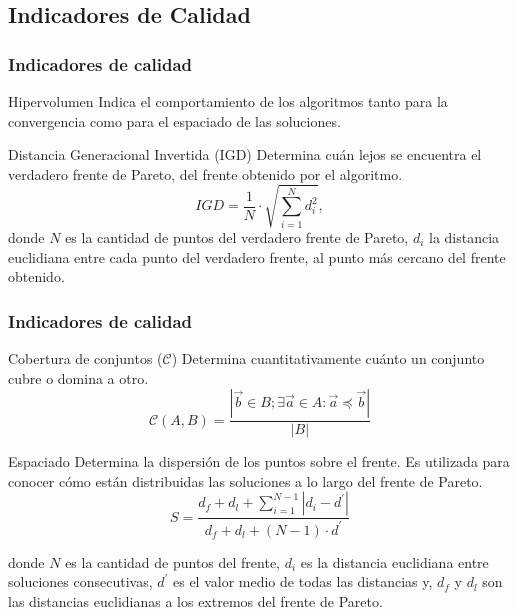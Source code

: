 \documentclass[10pt,compress]{beamer}
\begin{document}
\subsection{Indicadores de Calidad}
\begin{frame}
	\frametitle{Indicadores de calidad}
	\begin{block}{Hipervolumen}
			Indica el comportamiento de los algoritmos tanto para la convergencia como para el espaciado de las soluciones.
	\end{block}
	\begin{block}{Distancia Generacional Invertida (IGD)}
		Determina cu\'an lejos se encuentra el verdadero frente de Pareto, del frente obtenido por el algoritmo.
		$$
	IGD = \frac{1}{N} \cdot \sqrt{\sum^{N}_{i=1}{d^2_i}},
      $$     
      donde $N$ es la cantidad de puntos del verdadero frente de Pareto, 
			$d_i$ la distancia euclidiana entre cada punto del verdadero frente, al punto m\'as cercano del frente obtenido.       
	\end{block}
\end{frame}
\begin{frame}
	\frametitle{Indicadores de calidad}
	\begin{block}{Cobertura de conjuntos ($\mathcal{C}$)}
		Determina cuantitativamente cu\'anto un conjunto cubre o domina a otro.
		$$
	      \mathcal{C}\left(A, B \right) = \frac{|\vec{b} \in B; \exists \vec{a} \in A: \vec{a}\preceq \vec{b}|}{|B|}
	  $$
	\end{block}
	\begin{block}{Espaciado}
		 Determina la dispersi\'on de los puntos sobre el frente. Es utilizada para conocer 
	 c\'omo est\'an distribuidas las soluciones a lo largo del frente de Pareto.
		 $$S= \frac{d_f + d_l + \sum^{N-1}_{i=1}{|d_i-d^{'}|}}{d_f + d_l + \left(N -1\right)\cdot d^{'}}$$
  
      donde $N$ es la cantidad de puntos del frente, $d_i$ es la distancia euclidiana entre soluciones consecutivas, 
      $d^{'}$ es el valor medio de todas las distancias y, $d_f$ y $d_l$ son las distancias euclidianas a los extremos 
      del frente de Pareto.
	\end{block}
\end{frame}
\end{document}
